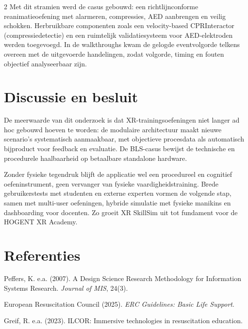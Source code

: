 \documentclass[a0,portrait]{hogent-poster}
\begin{document}
\begin{multicols}{2}
Met dit stramien werd de casus gebouwd: een richtlijnconforme reanimatieoefening met alarmeren, compressies, AED aanbrengen en veilig schokken. Herbruikbare componenten zoals een velocity-based CPRInteractor (compressiedetectie) en een ruimtelijk validatiesysteem voor AED-elektroden werden toegevoegd. In de walkthroughs kwam de gelogde eventvolgorde telkens overeen met de uitgevoerde handelingen, zodat volgorde, timing en fouten objectief analyseerbaar zijn.

\section{Discussie en besluit}

De meerwaarde van dit onderzoek is dat XR-trainingsoefeningen niet langer ad hoc gebouwd hoeven te worden: de modulaire architectuur maakt nieuwe scenario's systematisch aanmaakbaar, met objectieve procesdata als automatisch bijproduct voor feedback en evaluatie. De BLS-casus bewijst de technische en procedurele haalbaarheid op betaalbare standalone hardware.

Zonder fysieke tegendruk blijft de applicatie wel een procedureel en cognitief oefeninstrument, geen vervanger van fysieke vaardigheidstraining. Brede gebruikerstests met studenten en externe experten vormen de volgende stap, samen met multi-user oefeningen, hybride simulatie met fysieke manikins en dashboarding voor docenten. Zo groeit XR SkillSim uit tot fundament voor de HOGENT XR Academy.

\section{Referenties}

{\small
Peffers, K. e.a. (2007). A Design Science Research Methodology for Information Systems Research. \textit{Journal of MIS}, 24(3).

European Resuscitation Council (2025). \textit{ERC Guidelines: Basic Life Support}.

Greif, R. e.a. (2023). ILCOR: Immersive technologies in resuscitation education.
}

\end{multicols}
\end{document}
